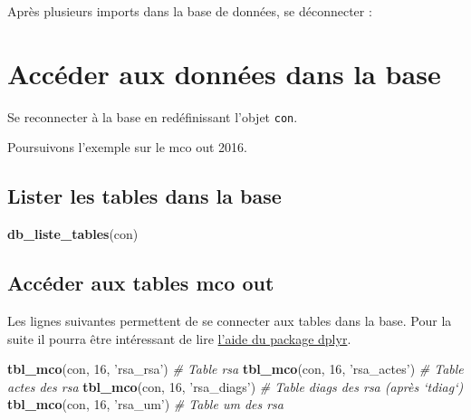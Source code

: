 \documentclass[]{book}
\newenvironment{Shaded}{\begin{snugshade}}{\end{snugshade}}
\newcommand{\KeywordTok}[1]{\textcolor[rgb]{0.13,0.29,0.53}{\textbf{#1}}}
\newcommand{\DecValTok}[1]{\textcolor[rgb]{0.00,0.00,0.81}{#1}}
\newcommand{\StringTok}[1]{\textcolor[rgb]{0.31,0.60,0.02}{#1}}
\newcommand{\CommentTok}[1]{\textcolor[rgb]{0.56,0.35,0.01}{\textit{#1}}}
\newcommand{\OperatorTok}[1]{\textcolor[rgb]{0.81,0.36,0.00}{\textbf{#1}}}
\newcommand{\NormalTok}[1]{#1}
\theoremstyle{definition}
\theoremstyle{definition}
\theoremstyle{definition}
\theoremstyle{remark}
\begin{document}
Après plusieurs imports dans la base de données, se déconnecter :

\begin{Shaded}
\end{Shaded}

\section{Accéder aux données dans la
base}\label{acceder-aux-donnees-dans-la-base}

Se reconnecter à la base en redéfinissant l'objet \texttt{con}.

Poursuivons l'exemple sur le mco out 2016.

\subsection{Lister les tables dans la
base}\label{lister-les-tables-dans-la-base}

\begin{Shaded}
\begin{Highlighting}[]
\KeywordTok{db_liste_tables}\NormalTok{(con)}
\end{Highlighting}
\end{Shaded}

\subsection{Accéder aux tables mco
out}\label{acceder-aux-tables-mco-out}

Les lignes suivantes permettent de se connecter aux tables dans la base.
Pour la suite il pourra être intéressant de lire
\href{http://db.rstudio.com/dplyr/}{l'aide du package dplyr}.

\begin{Shaded}
\begin{Highlighting}[]
\KeywordTok{tbl_mco}\NormalTok{(con, }\DecValTok{16}\NormalTok{, }\StringTok{'rsa_rsa'}\NormalTok{) }\CommentTok{# Table rsa}
\KeywordTok{tbl_mco}\NormalTok{(con, }\DecValTok{16}\NormalTok{, }\StringTok{'rsa_actes'}\NormalTok{) }\CommentTok{# Table actes des rsa}
\KeywordTok{tbl_mco}\NormalTok{(con, }\DecValTok{16}\NormalTok{, }\StringTok{'rsa_diags'}\NormalTok{) }\CommentTok{# Table diags des rsa (après `tdiag`)}
\KeywordTok{tbl_mco}\NormalTok{(con, }\DecValTok{16}\NormalTok{, }\StringTok{'rsa_um'}\NormalTok{) }\CommentTok{# Table um des rsa }
\end{Highlighting}
\end{Shaded}
\end{document}
